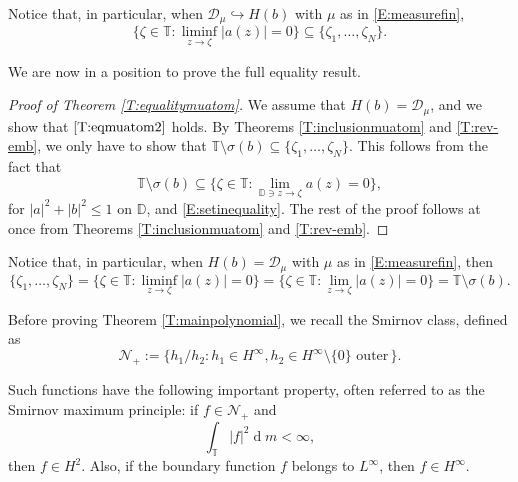 \documentclass[12pt]{amsart}
\theoremstyle{definition}
\theoremstyle{remark}
\theoremstyle{remark}
\begin{document}
Notice that, in particular, when $\mathcal{D}_\mu\hookrightarrow H(b)$ with $\mu$ as in \eqref{E:measurefin},
\begin{equation} \label{E:setinequality}
\{ \zeta\in\mathbb{T} \colon \liminf_{z\to\zeta} |a(z)|=0\}\subseteq\{\zeta_1,\ldots,\zeta_N\}.    
\end{equation}

We are now in a position to prove the full equality result.

\begin{proof}[Proof of Theorem \ref{T:equalitymuatom}]
    We assume that $H(b) = \mathcal{D}_\mu$, and we show that $\ref{T:eqmuatom2}$ holds. By Theorems \ref{T:inclusionmuatom} and \ref{T:rev-emb}, we only have to show that $\mathbb{T}\setminus\sigma(b)\subseteq\{\zeta_1,\ldots,\zeta_N\}$. This follows from the fact that
    \[\mathbb{T}\setminus\sigma(b)\subseteq\{\zeta\in\mathbb{T}\colon \lim_{\mathbb{D}\ni z\to\zeta}a(z)=0\},\]
    for $|a|^2+|b|^2\leq 1$ on $\mathbb{D}$, and \eqref{E:setinequality}.
    The rest of the proof follows at once from Theorems \ref{T:inclusionmuatom} and \ref{T:rev-emb}.
\end{proof}

Notice that, in particular, when $H(b)=\mathcal{D}_\mu$ with $\mu$ as in \eqref{E:measurefin}, then
\begin{equation*}  
\{\zeta_1,\ldots,\zeta_N\}=\{\zeta\in\mathbb{T} \colon \liminf_{z\to\zeta} |a(z)|=0\}=\{\zeta\in\mathbb{T} \colon \lim_{z\to\zeta} |a(z)|=0\}=\mathbb{T}\setminus\sigma(b).
\end{equation*}

Before proving Theorem \ref{T:mainpolynomial}, we recall the Smirnov class, defined as
    \[\mathcal{N}_+:=\big\{h_1/h_2\colon h_1\in H^\infty, h_2\in H^\infty\setminus\{0\}\,\,\text{outer}\,\big\}.\]

Such functions have the following important property, often referred to as the Smirnov maximum principle: if $f\in\mathcal{N}_+$ and 
 \[\int_\mathbb{T} |f|^2 \operatorname{d}\!m <\infty,\]
 then $f\in H^2$. Also, if the boundary function $f$ belongs to $L^\infty$, then $f\in H^\infty$.
\end{document}
